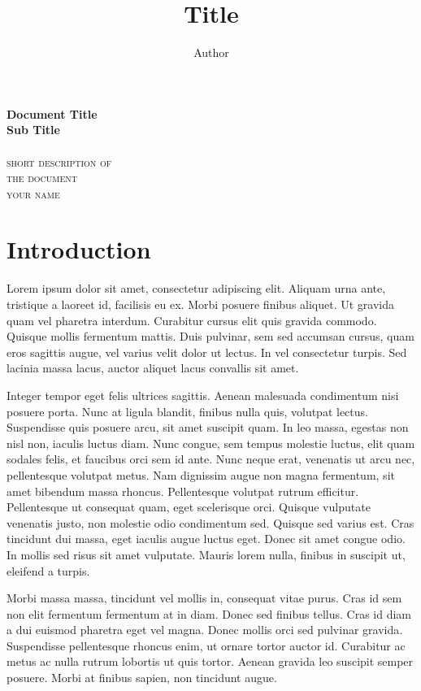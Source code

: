 \documentclass[12pt,a4paper]{article}
\title{ Title }
\author{ Author }
\begin{document}
\begin{center}
    \huge{\textbf{ Document Title }} \\
    \huge{\textbf{ Sub Title }}\\
    \hspace{200pt}\\
    \textsc{ short description of } \\
    \textsc{ the document }
    \vspace{280pt}\\
    \textsc{ your name }
\end{center}

\newpage
\tableofcontents
\newpage

\section{Introduction}



Lorem ipsum dolor sit amet, consectetur adipiscing elit. Aliquam urna ante, tristique a laoreet id, facilisis eu ex. Morbi posuere finibus aliquet. Ut gravida quam vel pharetra interdum. Curabitur cursus elit quis gravida commodo. Quisque mollis fermentum mattis. Duis pulvinar, sem sed accumsan cursus, quam eros sagittis augue, vel varius velit dolor ut lectus. In vel consectetur turpis. Sed lacinia massa lacus, auctor aliquet lacus convallis sit amet.

Integer tempor eget felis ultrices sagittis. Aenean malesuada condimentum nisi posuere porta. Nunc at ligula blandit, finibus nulla quis, volutpat lectus. Suspendisse quis posuere arcu, sit amet suscipit quam. In leo massa, egestas non nisl non, iaculis luctus diam. Nunc congue, sem tempus molestie luctus, elit quam sodales felis, et faucibus orci sem id ante. Nunc neque erat, venenatis ut arcu nec, pellentesque volutpat metus. Nam dignissim augue non magna fermentum, sit amet bibendum massa rhoncus. Pellentesque volutpat rutrum efficitur. Pellentesque ut consequat quam, eget scelerisque orci. Quisque vulputate venenatis justo, non molestie odio condimentum sed. Quisque sed varius est. Cras tincidunt dui massa, eget iaculis augue luctus eget. Donec sit amet congue odio. In mollis sed risus sit amet vulputate. Mauris lorem nulla, finibus in suscipit ut, eleifend a turpis.

Morbi massa massa, tincidunt vel mollis in, consequat vitae purus. Cras id sem non elit fermentum fermentum at in diam. Donec sed finibus tellus. Cras id diam a dui euismod pharetra eget vel magna. Donec mollis orci sed pulvinar gravida. Suspendisse pellentesque rhoncus enim, ut ornare tortor auctor id. Curabitur ac metus ac nulla rutrum lobortis ut quis tortor. Aenean gravida leo suscipit semper posuere. Morbi at finibus sapien, non tincidunt augue.
\end{document}
